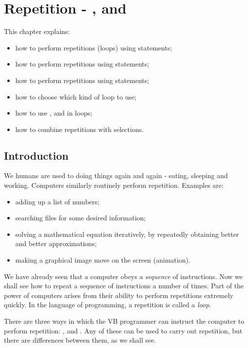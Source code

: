 \chapter{Repetition - ,  and }
\label{ch:repetition}

This chapter explains:
  \begin{itemize}
    \item how to perform repetitions (loops) using  statements;
    \item how to perform repetitions using  statements;
    \item how to perform repetitions using  statements;
    \item how to choose which kind of loop to use;
    \item how to use ,  and  in loops;
    \item how to combine repetitions with selections.
  \end{itemize}

  \section{Introduction}
		We humans are used to doing things again and again - eating, sleeping and working. Computers similarly routinely perform repetition. Examples are:
		\begin{itemize}
	    \item adding up a list of numbers;
  	  \item searching files for some desired information;
    	\item solving a mathematical equation iteratively, by repeatedly obtaining better and better approximations;
	    \item making a graphical image move on the screen (animation).
		\end{itemize}
		We have already seen that a computer obeys a \emph{sequence} of instructions. Now we shall see how to repeat a sequence of instructions a number of times. Part of the power of computers arises from their ability to perform repetitions extremely quickly. In the language of programming, a repetition is called a \emph{loop}.
		
		There are three ways in which the VB programmer can instruct the computer to perform repetition: ,  and . Any of these can be used to carry out repetition, but there are differences between them, as we shall see.

